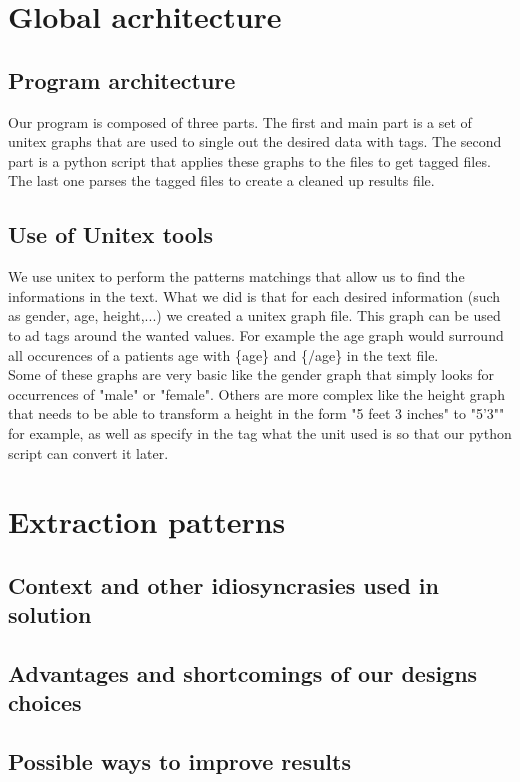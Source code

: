 \documentclass{eplDoc}
\begin{document}
\maketitle
\newpage

\section{Global acrhitecture}

\subsection{Program architecture}

Our program is composed of three parts. The first and main part is a set of unitex graphs that are used to single out the desired data with tags. The second part is a python script that applies these graphs to the files to get tagged files. The last one parses the tagged files to create a cleaned up results file. 

\subsection{Use of Unitex tools}

We use unitex to perform the patterns matchings that allow us to find the informations in the text. What we did is that for each desired information (such as gender, age, height,...) we created a unitex graph file. This graph can be used to ad tags around the wanted values. For example the age graph would surround all occurences of a patients age with \{age\} and \{/age\} in the text file. \\ 
Some of these graphs are very basic like the gender graph that simply looks for occurrences of "male" or "female". Others are more complex like the height graph that needs to be able to transform a height in the form "5 feet 3 inches" to "5'3"" for example, as well as specify in the tag what the unit used is so that our python script can convert it later. 

\section{Extraction patterns}

\subsection{Context and other idiosyncrasies used in solution}

\subsection{Advantages and shortcomings of our designs choices}

\subsection{Possible ways to improve results}
\end{document}
